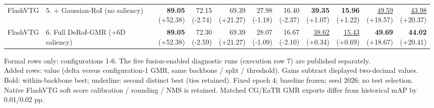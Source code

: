 \documentclass{article}
\begin{document}
{\begin{tabular}{llrrrrrrrrr}
FlashVTG & 5. + Gaussian-RoI (no saliency) & \shortstack{\textbf{89.05} \\ {\scriptsize (+52.38)}} & \shortstack{72.15 \\ {\scriptsize (-2.74)}} & \shortstack{69.39 \\ {\scriptsize (+21.27)}} & \shortstack{27.98 \\ {\scriptsize (-1.18)}} & \shortstack{16.40 \\ {\scriptsize (-2.37)}} & \shortstack{\textbf{39.35} \\ {\scriptsize (+1.07)}} & \shortstack{\textbf{15.96} \\ {\scriptsize (+1.22)}} & \shortstack{\underline{49.59} \\ {\scriptsize (+18.57)}} & \shortstack{\underline{43.98} \\ {\scriptsize (+20.37)}} \\
FlashVTG & 6. Full DeRoI-GMR (+6D saliency) & \shortstack{\textbf{89.05} \\ {\scriptsize (+52.38)}} & \shortstack{72.30 \\ {\scriptsize (-2.59)}} & \shortstack{69.39 \\ {\scriptsize (+21.27)}} & \shortstack{28.07 \\ {\scriptsize (-1.09)}} & \shortstack{16.67 \\ {\scriptsize (-2.10)}} & \shortstack{\underline{38.62} \\ {\scriptsize (+0.34)}} & \shortstack{\underline{15.43} \\ {\scriptsize (+0.69)}} & \shortstack{\textbf{49.69} \\ {\scriptsize (+18.67)}} & \shortstack{\textbf{44.02} \\ {\scriptsize (+20.41)}} \\
\bottomrule\end{tabular}}\par\medskip\footnotesize
Formal rows only: configurations 1-6. The five fusion-enabled diagnostic runs (execution row 7) are published separately.\\Added rows: value (delta versus configuration-1 GMR, same backbone / split / threshold). Gains subtract displayed two-decimal values.\\Bold: within-backbone best; underline: second distinct best (ties retained). Fixed epoch 4; baseline frozen; seed 2026; no test selection.\\Native FlashVTG soft score calibration / rounding / NMS is retained. Matched CG/EaTR GMR exports differ from historical mAP by 0.01/0.02 pp.
\end{document}
